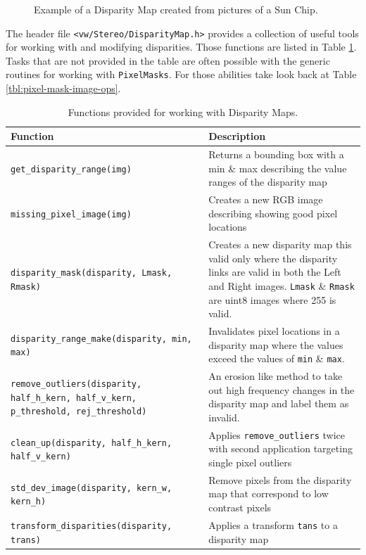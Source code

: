 \begin{figure}[bp]
\caption{Example of a Disparity Map created from pictures of a Sun Chip.}
\label{fig:disparity-example}
\end{figure}

The header file {\tt<vw/Stereo/DisparityMap.h>} provides a collection
of useful tools for working with and modifying disparities. Those
functions are listed in Table \ref{tbl:disparity-map-functions}. Tasks
that are not provided in the table are often possible with the generic
routines for working with {\tt PixelMasks}. For those abilities take
look back at Table \ref{tbl:pixel-mask-image-ops}.

\begin{table}[tbh]\begin{centering}
\begin{tabular}{|p{3 in}|p{4 in}|} \hline
Function & Description \\ \hline \hline
{\tt get\_disparity\_range(img)} & Returns a bounding box with a min \& max describing the value ranges of the disparity map \\ \hline
{\tt missing\_pixel\_image(img)} & Creates a new RGB image describing showing good pixel locations \\ \hline
{\tt disparity\_mask(disparity, Lmask, Rmask)} & Creates a new disparity map this valid only where the disparity links are valid in both the Left and Right images. {\tt Lmask} \& {\tt Rmask} are uint8 images where 255 is valid. \\ \hline
{\tt disparity\_range\_make(disparity, min, max)} & Invalidates pixel locations in a disparity map where the values exceed the values of {\tt min} \& {\tt max}. \\ \hline
{\tt remove\_outliers(disparity, half\_h\_kern, half\_v\_kern, p\_threshold, rej\_threshold)} & An erosion like method to take out high frequency changes in the disparity map and label them as invalid. \\ \hline
{\tt clean\_up(disparity, half\_h\_kern, half\_v\_kern)} & Applies {\tt remove\_outliers} twice with second application targeting single pixel outliers \\ \hline
{\tt std\_dev\_image(disparity, kern\_w, kern\_h)} & Remove pixels from the disparity map that correspond to low contrast pixels \\ \hline
{\tt transform\_disparities(disparity, trans)} & Applies a transform {\tt tans} to a disparity map \\ \hline
\end{tabular}
\caption{ Functions provided for working with Disparity Maps.}
\label{tbl:disparity-map-functions}
\end{centering}
\end{table}


